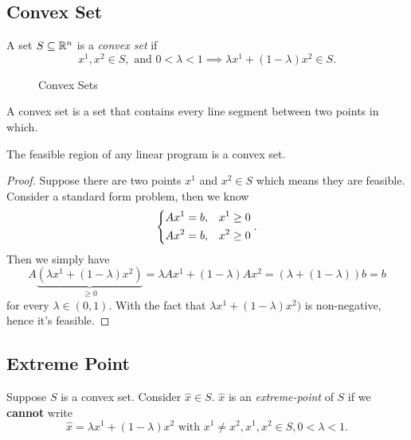 \subsection{Convex Set}
\begin{definition}
	A set \(S\subseteq \mathbb{\MakeUppercase{R}}^n\) is a \emph{convex set} if
	\[
		x^1, x^2\in S, \text{ and }0<\lambda<1 \implies \lambda x^1 + (1-\lambda)x^2 \in S.
	\]
\end{definition}

\begin{figure}[H]
	\centering
	\caption{Convex Sets}
	\label{fig:convex-set}
\end{figure}

\begin{intuition}
	A convex set is a set that contains every line segment between two points in which.
\end{intuition}

\begin{remark}
	The feasible region of any linear program is a convex set.
\end{remark}
\begin{proof}
	Suppose there are two points \(x^1\) and \(x^2\in S\) which means they are feasible. Consider a standard form problem, then we know
	\[
		\begin{dcases}
			Ax^1 = b, & x^1\geq 0 \\
			Ax^2 = b, & x^2\geq 0 \\
		\end{dcases}.
	\]
	Then we simply have
	\[
		A\underbrace{(\lambda x^1 + (1-\lambda)x^2)}_{\geq 0} = \lambda A x^1 + (1-\lambda)A x^2 = (\lambda + (1-\lambda))b = b
	\]
	for every \(\lambda \in (0,1)\). With the fact that \(\lambda x^1 + (1-\lambda)x^2)\) is non-negative, hence it's feasible.
\end{proof}

\subsection{Extreme Point}
\begin{definition}
	Suppose \(S\) is a convex set. Consider \(\hat{x} \in S\). \(\hat{x}\) is an \emph{extreme-point} of \(S\) if we \textbf{cannot} write
	\[
		\hat{x} = \lambda x^1 + (1-\lambda)x^2 \text{ with }x^1 \neq x^2, x^1, x^2\in S, 0<\lambda<1.
	\]
\end{definition}

